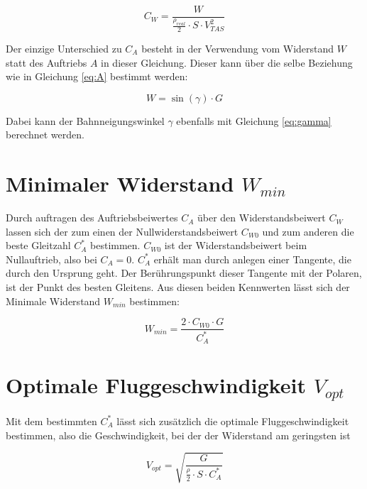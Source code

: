 \begin{equation}
C_W=\frac{W}{\frac{\rho_{real}}{2} \cdot S \cdot V_{TAS}^2}
\end{equation}

Der einzige Unterschied zu $C_A$ besteht in der Verwendung vom Widerstand $W$ statt des Auftriebs $A$ in dieser Gleichung. Dieser kann über die selbe Beziehung wie in Gleichung \ref{eq:A} bestimmt werden:

\begin{equation}
W=\sin(\gamma) \cdot G
\end{equation}

Dabei kann der Bahnneigungswinkel $\gamma$ ebenfalls mit Gleichung \ref{eq:gamma} berechnet werden.

\section{Minimaler Widerstand $W_{min}$}

Durch auftragen des Auftriebsbeiwertes $C_A$ über den Widerstandsbeiwert $C_W$ lassen sich der zum einen der Nullwiderstandsbeiwert $C_{W0}$ und zum anderen die beste Gleitzahl $C_A^*$ bestimmen. $C_{W0}$ ist der Widerstandsbeiwert beim Nullauftrieb, also bei $C_A=0$. $C_A^*$ erhält man durch anlegen einer Tangente, die durch den Ursprung geht. Der Berührungspunkt dieser Tangente mit der Polaren, ist der Punkt des besten Gleitens. Aus diesen beiden Kennwerten lässt sich der Minimale Widerstand $W_{min}$ bestimmen:

\begin{equation}
W_{min}=\frac{2 \cdot C_{W0} \cdot G}{C_A^*}
\label{eq:W_min}
\end{equation}

\section{Optimale Fluggeschwindigkeit $V_{opt}$}

Mit dem bestimmten $C_A^*$ lässt sich zusätzlich die optimale Fluggeschwindigkeit bestimmen, also die Geschwindigkeit, bei der der Widerstand am geringsten ist

\begin{equation}
V_{opt}=\sqrt{\frac{G}{\frac{\rho}{2} \cdot S \cdot C_A^*}}
\label{eq:V_opt}
\end{equation}



